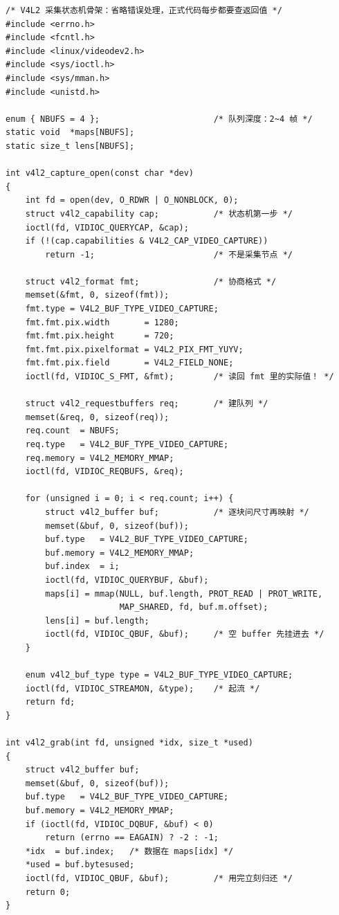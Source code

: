 \documentclass[12pt,a4paper,fontset=fandol]{ctexbook}
\begin{document}
\begin{lstlisting}[style=cstyle,caption={V4L2 采集：从 QUERYCAP 到 DQBUF 的缓冲队列骨架（MMAP 路径）},label={lst:ch04-v4l2buf}]
/* V4L2 采集状态机骨架：省略错误处理，正式代码每步都要查返回值 */
#include <errno.h>
#include <fcntl.h>
#include <linux/videodev2.h>
#include <sys/ioctl.h>
#include <sys/mman.h>
#include <unistd.h>

enum { NBUFS = 4 };                       /* 队列深度：2~4 帧 */
static void  *maps[NBUFS];
static size_t lens[NBUFS];

int v4l2_capture_open(const char *dev)
{
    int fd = open(dev, O_RDWR | O_NONBLOCK, 0);
    struct v4l2_capability cap;           /* 状态机第一步 */
    ioctl(fd, VIDIOC_QUERYCAP, &cap);
    if (!(cap.capabilities & V4L2_CAP_VIDEO_CAPTURE))
        return -1;                        /* 不是采集节点 */

    struct v4l2_format fmt;               /* 协商格式 */
    memset(&fmt, 0, sizeof(fmt));
    fmt.type = V4L2_BUF_TYPE_VIDEO_CAPTURE;
    fmt.fmt.pix.width       = 1280;
    fmt.fmt.pix.height      = 720;
    fmt.fmt.pix.pixelformat = V4L2_PIX_FMT_YUYV;
    fmt.fmt.pix.field       = V4L2_FIELD_NONE;
    ioctl(fd, VIDIOC_S_FMT, &fmt);        /* 读回 fmt 里的实际值！ */

    struct v4l2_requestbuffers req;       /* 建队列 */
    memset(&req, 0, sizeof(req));
    req.count  = NBUFS;
    req.type   = V4L2_BUF_TYPE_VIDEO_CAPTURE;
    req.memory = V4L2_MEMORY_MMAP;
    ioctl(fd, VIDIOC_REQBUFS, &req);

    for (unsigned i = 0; i < req.count; i++) {
        struct v4l2_buffer buf;           /* 逐块问尺寸再映射 */
        memset(&buf, 0, sizeof(buf));
        buf.type   = V4L2_BUF_TYPE_VIDEO_CAPTURE;
        buf.memory = V4L2_MEMORY_MMAP;
        buf.index  = i;
        ioctl(fd, VIDIOC_QUERYBUF, &buf);
        maps[i] = mmap(NULL, buf.length, PROT_READ | PROT_WRITE,
                       MAP_SHARED, fd, buf.m.offset);
        lens[i] = buf.length;
        ioctl(fd, VIDIOC_QBUF, &buf);     /* 空 buffer 先挂进去 */
    }

    enum v4l2_buf_type type = V4L2_BUF_TYPE_VIDEO_CAPTURE;
    ioctl(fd, VIDIOC_STREAMON, &type);    /* 起流 */
    return fd;
}

int v4l2_grab(int fd, unsigned *idx, size_t *used)
{
    struct v4l2_buffer buf;
    memset(&buf, 0, sizeof(buf));
    buf.type   = V4L2_BUF_TYPE_VIDEO_CAPTURE;
    buf.memory = V4L2_MEMORY_MMAP;
    if (ioctl(fd, VIDIOC_DQBUF, &buf) < 0)
        return (errno == EAGAIN) ? -2 : -1;
    *idx  = buf.index;   /* 数据在 maps[idx] */
    *used = buf.bytesused;
    ioctl(fd, VIDIOC_QBUF, &buf);         /* 用完立刻归还 */
    return 0;
}
\end{lstlisting}
\end{document}
